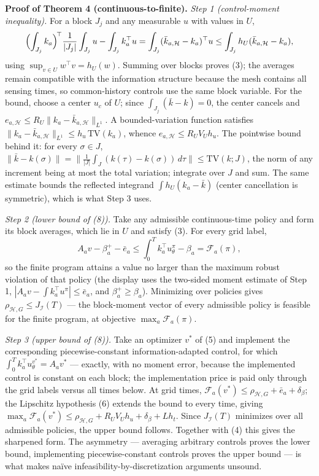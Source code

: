 \documentclass[10pt,article]{article}
\begin{document}
\textbf{Proof of Theorem 4 (continuous-to-finite).}
\emph{Step 1 (control-moment inequality).} For a block \(J_j\) and any
measurable \(u\) with values in \(U\),
\[
\Bigl(\int_{J_j} k_a\Bigr)^{\!\top} \frac{1}{|J_j|}\int_{J_j} u
- \int_{J_j} k_a^\top u
= \int_{J_j} (\bar k_{a,\mathcal H} - k_a)^\top u
\le \int_{J_j} h_U(\bar k_{a,\mathcal H} - k_a),
\]
using \(\sup_{v \in U} w^\top v = h_U(w)\). Summing over blocks proves (3);
the averages remain compatible with the information structure because the
mesh contains all sensing times, so common-history controls use the same
block variable. For the bound, choose a center \(u_c\) of \(U\); since
\(\int_{J_j}(\bar k - k) = 0\), the center cancels and
\(e_{a,\mathcal H} \le R_U \|k_a - \bar k_{a,\mathcal H}\|_{L^1}\). A
bounded-variation function satisfies \(\|k_a - \bar k_{a,\mathcal
H}\|_{L^1} \le h_u\, \mathrm{TV}(k_a)\), whence \(e_{a,\mathcal H} \le R_U
V_U h_u\). The pointwise bound behind it: for every \(\sigma \in J\),
\(\|\bar k - k(\sigma)\| = \bigl\|\tfrac{1}{|J|}\int_J (k(\tau) -
k(\sigma))\,d\tau\bigr\| \le \mathrm{TV}(k; J)\), the norm of any
increment being at most the total variation; integrate over \(J\) and
sum. The same estimate bounds the reflected integrand
\(\int h_U(k_a - \bar k)\) (center cancellation is symmetric), which
is what Step 3 uses.

\emph{Step 2 (lower bound of (8)).} Take any admissible continuous-time
policy and form its block averages, which lie in \(U\) and satisfy (3). For
every grid label,
\[
A_a v - \beta_a^{+} - \bar e_a \le \int_0^T k_a^\top u^\pi_\theta -
\beta_a = \mathcal F_a(\pi),
\]
so the finite program attains a value no larger than the maximum robust
violation of that policy (the display uses the two-sided moment estimate
of Step 1, \(|A_a v - \int k_a^\top u^\pi| \le \bar e_a\), and
\(\beta_a^{+} \ge \beta_a\)). Minimizing over policies gives
\(\rho_{\mathcal H,G} \le J_{\mathcal I}(T)\) --- the block-moment
vector of every admissible policy is feasible for the finite program, at
objective \(\max_a \mathcal F_a(\pi)\).

\emph{Step 3 (upper bound of (8)).} Take an optimizer \(v^{*}\) of (5) and
implement the corresponding piecewise-constant information-adapted control,
for which \(\int_0^T k_a^\top u^{v^{*}}_\theta = A_a v^{*}\) --- exactly,
with no moment error, because the implemented control is constant on each
block; the implementation price is paid only through the grid labels
versus all times below. At grid times,
\(\mathcal F_a(v^{*}) \le \rho_{\mathcal H,G} + \bar e_a + \delta_\beta\);
the Lipschitz hypothesis (6) extends the bound to every time, giving
\(\max_a \mathcal F_a(v^{*}) \le \rho_{\mathcal H,G} + R_U V_U h_u +
\delta_\beta + L h_t\). Since \(J_{\mathcal I}(T)\) minimizes over all
admissible policies, the upper bound follows. Together with (4) this gives
the sharpened form. The asymmetry --- averaging arbitrary controls proves
the lower bound, implementing piecewise-constant controls proves the upper
bound --- is what makes na\"ive infeasibility-by-discretization arguments
unsound.
\end{document}
